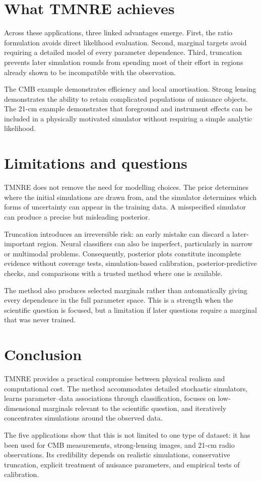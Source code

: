 ﻿\documentclass[11pt,a4paper]{article}
\begin{document}
\section{What TMNRE achieves}
Across these applications, three linked advantages emerge. First, the ratio formulation avoids direct likelihood evaluation. Second, marginal targets avoid requiring a detailed model of every parameter dependence. Third, truncation prevents later simulation rounds from spending most of their effort in regions already shown to be incompatible with the observation.

The CMB example demonstrates efficiency and local amortisation. Strong lensing demonstrates the ability to retain complicated populations of nuisance objects. The 21-cm example demonstrates that foreground and instrument effects can be included in a physically motivated simulator without requiring a simple analytic likelihood.

\section{Limitations and questions}
TMNRE does not remove the need for modelling choices. The prior determines where the initial simulations are drawn from, and the simulator determines which forms of uncertainty can appear in the training data. A misspecified simulator can produce a precise but misleading posterior.

Truncation introduces an irreversible risk: an early mistake can discard a later-important region. Neural classifiers can also be imperfect, particularly in narrow or multimodal problems. Consequently, posterior plots constitute incomplete evidence without coverage tests, simulation-based calibration, posterior-predictive checks, and comparisons with a trusted method where one is available.

The method also produces selected marginals rather than automatically giving every dependence in the full parameter space. This is a strength when the scientific question is focused, but a limitation if later questions require a marginal that was never trained.

\section{Conclusion}
TMNRE provides a practical compromise between physical realism and computational cost. The method accommodates detailed stochastic simulators, learns parameter--data associations through classification, focuses on low-dimensional marginals relevant to the scientific question, and iteratively concentrates simulations around the observed data.

The five applications show that this is not limited to one type of dataset: it has been used for CMB measurements, strong-lensing images, and 21-cm radio observations. Its credibility depends on realistic simulations, conservative truncation, explicit treatment of nuisance parameters, and empirical tests of calibration.



\end{document}
